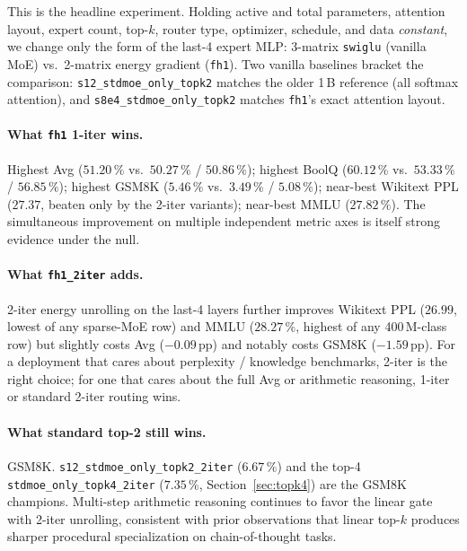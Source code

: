 \documentclass[oneside]{article}
\begin{document}
This is the headline experiment. Holding active and total parameters,
attention layout, expert count, top-$k$, router type, optimizer,
schedule, and data \emph{constant}, we change only the form of the
last-4 expert MLP: 3-matrix \texttt{swiglu} (vanilla MoE) vs.\
2-matrix energy gradient (\texttt{fh1}). Two vanilla baselines bracket
the comparison: \texttt{s12\_stdmoe\_only\_topk2} matches the older
1\,B reference (all softmax attention), and
\texttt{s8e4\_stdmoe\_only\_topk2} matches \texttt{fh1}'s exact
attention layout.

\paragraph{What \texttt{fh1} 1-iter wins.}
Highest Avg ($51.20\,\%$ vs.\ $50.27\,\%$ / $50.86\,\%$); highest BoolQ
($60.12\,\%$ vs.\ $53.33\,\%$ / $56.85\,\%$); highest GSM8K ($5.46\,\%$
vs.\ $3.49\,\%$ / $5.08\,\%$); near-best Wikitext PPL ($27.37$,
beaten only by the 2-iter variants); near-best MMLU ($27.82\,\%$).
The simultaneous improvement on multiple independent metric axes is
itself strong evidence under the null.

\paragraph{What \texttt{fh1\_2iter} adds.}
2-iter energy unrolling on the last-4 layers further improves Wikitext
PPL ($26.99$, lowest of any sparse-MoE row) and MMLU ($28.27\,\%$,
highest of any 400\,M-class row) but slightly costs Avg
($-0.09\,$pp) and notably costs GSM8K ($-1.59\,$pp). For a deployment
that cares about perplexity / knowledge benchmarks, 2-iter is the
right choice; for one that cares about the full Avg or arithmetic
reasoning, 1-iter or standard 2-iter routing wins.

\paragraph{What standard top-2 still wins.}
GSM8K. \texttt{s12\_stdmoe\_only\_topk2\_2iter} ($6.67\,\%$) and the
top-4 \texttt{stdmoe\_only\_topk4\_2iter} ($7.35\,\%$,
Section~\ref{sec:topk4}) are the GSM8K champions. Multi-step
arithmetic reasoning continues to favor the linear gate with 2-iter
unrolling, consistent with prior observations that linear top-$k$
produces sharper procedural specialization on chain-of-thought tasks.


\end{document}
